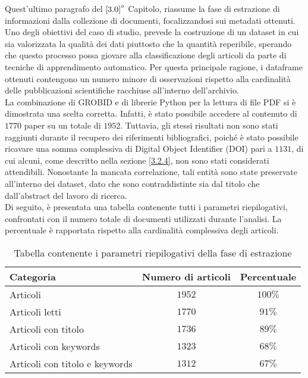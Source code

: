 Quest'ultimo paragrafo del $\ref{3.0}^{\circ}$ Capitolo, riassume la fase di estrazione di informazioni dalla collezione di documenti, focalizzandosi sui metadati ottenuti. \vspace{7pt} \\
Uno degli obiettivi del caso di studio, prevede la costruzione di un dataset in cui sia valorizzata la qualità dei dati piuttosto che la quantità reperibile, sperando che questo processo possa giovare alla classificazione degli articoli da parte di tecniche di apprendimento automatico. Per questa principale ragione, i dataframe ottenuti contengono un numero minore di osservazioni rispetto alla cardinalità delle pubblicazioni scientifiche racchiuse all'interno dell'archivio. \vspace{7pt} \\
La combinazione di GROBID e di librerie Python per la lettura di file PDF si è dimostrata una scelta corretta. Infatti, è stato possibile accedere al contenuto di $1770$ paper su un totale di $1952$. Tuttavia, gli stessi risultati non sono stati raggiunti durante il recupero dei riferimenti bibliografici, poiché è stato possibile ricavare una somma complessiva di Digital Object Identifier (DOI) pari a $1131$, di cui alcuni, come descritto nella sezione \ref{3.2.4}, non sono stati considerati attendibili. Nonostante la mancata correlazione, tali entità sono state preservate all'interno dei dataset, dato che sono contraddistinte sia dal titolo che dall'abstract del lavoro di ricerca. \vspace{7pt} \\
Di seguito, è presentata una tabella contenente tutti i parametri riepilogativi, confrontati con il numero totale di documenti utilizzati durante l'analisi. La percentuale è rapportata rispetto alla cardinalità complessiva degli articoli.
\begin{table}[H]
    \centering
    \begin{tabular}{lcc}
        \toprule
        \textbf{Categoria} & \textbf{Numero di articoli} & \textbf{Percentuale} \\
        \midrule
        Articoli & $1952$ & $100\%$ \\
        \hline
        Articoli letti & $1770$ & $91\%$ \\
        Articoli con titolo & $1736$ & $89\%$ \\
        Articoli con keywords & $1323$ & $68\%$ \\
        Articoli con titolo e keywords & $1312$ & $67\%$ \\
        \bottomrule
    \end{tabular}
    \caption{Tabella contenente i parametri riepilogativi della fase di estrazione}
\end{table}